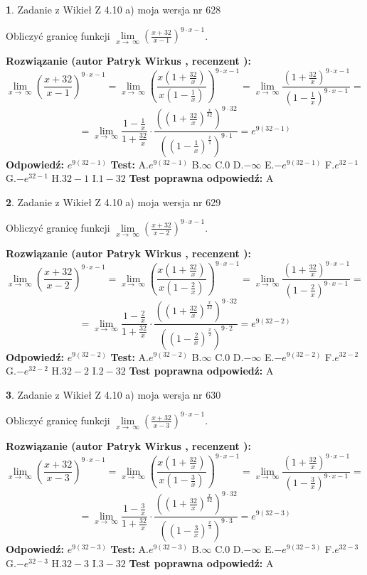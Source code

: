 \documentclass[12pt, a4paper]{article}
\theoremstyle{definition} %
\newtheorem{zad}{}
\newcommand{\zadStart}[1]{\begin{zad}#1\newline}
\newcommand{\zadStop}{\end{zad}}
\newcommand{\rozwStart}[2]{\noindent \textbf{Rozwiązanie (autor #1 , recenzent #2): }\newline}
\newcommand{\rozwStop}{\newline}
\newcommand{\odpStart}{\noindent \textbf{Odpowiedź:}\newline}
\newcommand{\odpStop}{\newline}
\newcommand{\testStart}{\noindent \textbf{Test:}\newline}
\newcommand{\testStop}{\newline}
\newcommand{\kluczStart}{\noindent \textbf{Test poprawna odpowiedź:}\newline}
\newcommand{\kluczStop}{\newline}
\begin{document}
\zadStart{Zadanie z Wikieł Z 4.10 a) moja wersja nr 628}


Obliczyć granicę funkcji  $\lim\limits_{x\to\ \infty}(\frac{x+32}{x-1})^{9\cdot x-1}$.
\zadStop
\rozwStart{Patryk Wirkus}{}
$$\lim\limits_{x\to\ \infty}(\frac{x+32}{x-1})^{9\cdot x-1} = \lim\limits_{x\to\ \infty}(\frac{x(1+\frac{32}{x})}{x(1-\frac{1}{x})})^{9\cdot x-1}=\lim\limits_{x\to\ \infty}\frac{(1+\frac{32}{x})^{9\cdot x-1}}{(1-\frac{1}{x})^{9\cdot x-1}}=$$
$$=\lim\limits_{x\to\ \infty}\frac{1-\frac{1}{x}}{1+\frac{32}{x}}\cdot\frac{((1+\frac{32}{x})^{\frac{x}{32}})^{9\cdot32}}{((1-\frac{1}{x})^{\frac{x}{1}})^{9\cdot1}}=e^{9(32-1)}$$
\rozwStop
\odpStart
$e^{9(32-1)}$
\odpStop
\testStart
A.$e^{9(32-1)}$ B.$\infty$ C.$0$ D.$-\infty$ E.$-e^{9(32-1)}$
F.$e^{32-1}$ G.$-e^{32-1}$
H.$32-1$
I.$1-32$
\testStop
\kluczStart
A
\kluczStop



\zadStart{Zadanie z Wikieł Z 4.10 a) moja wersja nr 629}


Obliczyć granicę funkcji  $\lim\limits_{x\to\ \infty}(\frac{x+32}{x-2})^{9\cdot x-1}$.
\zadStop
\rozwStart{Patryk Wirkus}{}
$$\lim\limits_{x\to\ \infty}(\frac{x+32}{x-2})^{9\cdot x-1} = \lim\limits_{x\to\ \infty}(\frac{x(1+\frac{32}{x})}{x(1-\frac{2}{x})})^{9\cdot x-1}=\lim\limits_{x\to\ \infty}\frac{(1+\frac{32}{x})^{9\cdot x-1}}{(1-\frac{2}{x})^{9\cdot x-1}}=$$
$$=\lim\limits_{x\to\ \infty}\frac{1-\frac{2}{x}}{1+\frac{32}{x}}\cdot\frac{((1+\frac{32}{x})^{\frac{x}{32}})^{9\cdot32}}{((1-\frac{2}{x})^{\frac{x}{2}})^{9\cdot2}}=e^{9(32-2)}$$
\rozwStop
\odpStart
$e^{9(32-2)}$
\odpStop
\testStart
A.$e^{9(32-2)}$ B.$\infty$ C.$0$ D.$-\infty$ E.$-e^{9(32-2)}$
F.$e^{32-2}$ G.$-e^{32-2}$
H.$32-2$
I.$2-32$
\testStop
\kluczStart
A
\kluczStop



\zadStart{Zadanie z Wikieł Z 4.10 a) moja wersja nr 630}


Obliczyć granicę funkcji  $\lim\limits_{x\to\ \infty}(\frac{x+32}{x-3})^{9\cdot x-1}$.
\zadStop
\rozwStart{Patryk Wirkus}{}
$$\lim\limits_{x\to\ \infty}(\frac{x+32}{x-3})^{9\cdot x-1} = \lim\limits_{x\to\ \infty}(\frac{x(1+\frac{32}{x})}{x(1-\frac{3}{x})})^{9\cdot x-1}=\lim\limits_{x\to\ \infty}\frac{(1+\frac{32}{x})^{9\cdot x-1}}{(1-\frac{3}{x})^{9\cdot x-1}}=$$
$$=\lim\limits_{x\to\ \infty}\frac{1-\frac{3}{x}}{1+\frac{32}{x}}\cdot\frac{((1+\frac{32}{x})^{\frac{x}{32}})^{9\cdot32}}{((1-\frac{3}{x})^{\frac{x}{3}})^{9\cdot3}}=e^{9(32-3)}$$
\rozwStop
\odpStart
$e^{9(32-3)}$
\odpStop
\testStart
A.$e^{9(32-3)}$ B.$\infty$ C.$0$ D.$-\infty$ E.$-e^{9(32-3)}$
F.$e^{32-3}$ G.$-e^{32-3}$
H.$32-3$
I.$3-32$
\testStop
\kluczStart
A
\kluczStop
\end{document}
